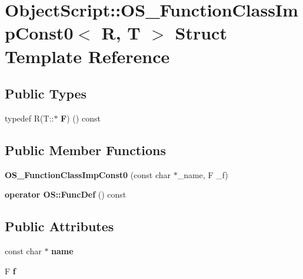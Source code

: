 \hypertarget{struct_object_script_1_1_o_s___function_class_imp_const0}{}\section{Object\+Script\+:\+:O\+S\+\_\+\+Function\+Class\+Imp\+Const0$<$ R, T $>$ Struct Template Reference}
\label{struct_object_script_1_1_o_s___function_class_imp_const0}
\subsection*{Public Types}
\begin{DoxyCompactItemize}
\item 
typedef R(T\+::$\ast$ {\bfseries F}) () const \hypertarget{struct_object_script_1_1_o_s___function_class_imp_const0_a668829bdaf3c84d52d94dce135c1e2a6}{}\label{struct_object_script_1_1_o_s___function_class_imp_const0_a668829bdaf3c84d52d94dce135c1e2a6}

\end{DoxyCompactItemize}
\subsection*{Public Member Functions}
\begin{DoxyCompactItemize}
\item 
{\bfseries O\+S\+\_\+\+Function\+Class\+Imp\+Const0} (const char $\ast$\+\_\+name, F \+\_\+f)\hypertarget{struct_object_script_1_1_o_s___function_class_imp_const0_abaeb8cd37e707babb70916ac58294df9}{}\label{struct_object_script_1_1_o_s___function_class_imp_const0_abaeb8cd37e707babb70916ac58294df9}

\item 
{\bfseries operator O\+S\+::\+Func\+Def} () const \hypertarget{struct_object_script_1_1_o_s___function_class_imp_const0_a33778bd2de2c7571cc3f80fbebd86fbb}{}\label{struct_object_script_1_1_o_s___function_class_imp_const0_a33778bd2de2c7571cc3f80fbebd86fbb}

\end{DoxyCompactItemize}
\subsection*{Public Attributes}
\begin{DoxyCompactItemize}
\item 
const char $\ast$ {\bfseries name}\hypertarget{struct_object_script_1_1_o_s___function_class_imp_const0_ab0e5399bba005ba99a6840e36fac99aa}{}\label{struct_object_script_1_1_o_s___function_class_imp_const0_ab0e5399bba005ba99a6840e36fac99aa}

\item 
F {\bfseries f}\hypertarget{struct_object_script_1_1_o_s___function_class_imp_const0_a338360606cf234cde06400a034f8f984}{}\label{struct_object_script_1_1_o_s___function_class_imp_const0_a338360606cf234cde06400a034f8f984}

\end{DoxyCompactItemize}


